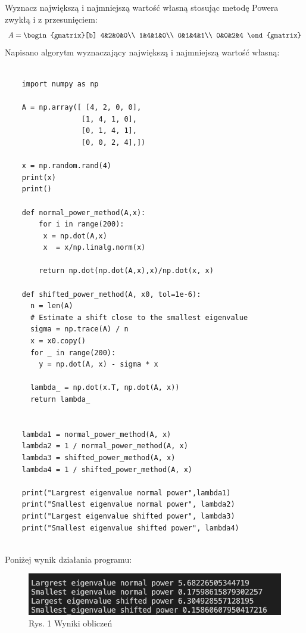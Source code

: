 \documentclass{article}
\begin{document}
Wyznacz największą i najmniejszą wartość własną stosując metodę Powera zwykłą
i z przesunięciem:
\begin{equation}
  A = 
  \begin{gmatrix}[b]
    4&2&0&0\\
    1&4&1&0\\
    0&1&4&1\\
    0&0&2&4
  \end{gmatrix}
\end{equation}
Napisano algorytm wyznaczający największą i najmniejszą wartość własną:
\begin{lstlisting}

    import numpy as np

    A = np.array([ [4, 2, 0, 0],
                  [1, 4, 1, 0],
                  [0, 1, 4, 1],
                  [0, 0, 2, 4],])
    
    x = np.random.rand(4)
    print(x)
    print()
    
    def normal_power_method(A,x):
        for i in range(200):
         x = np.dot(A,x)
         x  = x/np.linalg.norm(x)
        
        return np.dot(np.dot(A,x),x)/np.dot(x, x)
    
    def shifted_power_method(A, x0, tol=1e-6):
      n = len(A)
      # Estimate a shift close to the smallest eigenvalue
      sigma = np.trace(A) / n
      x = x0.copy()
      for _ in range(200):
        y = np.dot(A, x) - sigma * x
    
      lambda_ = np.dot(x.T, np.dot(A, x))
      return lambda_
       
    
    lambda1 = normal_power_method(A, x) 
    lambda2 = 1 / normal_power_method(A, x)
    lambda3 = shifted_power_method(A, x)
    lambda4 = 1 / shifted_power_method(A, x)
    
    print("Largrest eigenvalue normal power",lambda1)
    print("Smallest eigenvalue normal power", lambda2)
    print("Largest eigenvalue shifted power", lambda3)
    print("Smallest eigenvalue shifted power", lambda4)
  
  \end{lstlisting}
  Poniżej wynik działania programu:
  \begin{figure}[h]
    \includegraphics[scale=0.7]{image.png}
    \centering
    \caption*{Rys. 1 Wyniki obliczeń}
    \end{figure}
\end{document}
